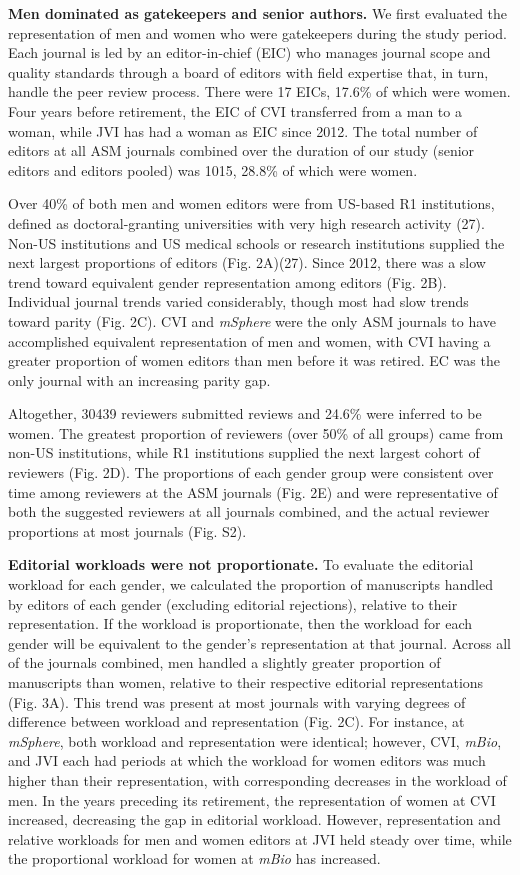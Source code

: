 \documentclass[11pt,]{article}
\begin{document}
\textbf{Men dominated as gatekeepers and senior authors.} We first
evaluated the representation of men and women who were gatekeepers
during the study period. Each journal is led by an editor-in-chief (EIC)
who manages journal scope and quality standards through a board of
editors with field expertise that, in turn, handle the peer review
process. There were 17 EICs, 17.6\% of which were women. Four years
before retirement, the EIC of CVI transferred from a man to a woman,
while JVI has had a woman as EIC since 2012. The total number of editors
at all ASM journals combined over the duration of our study (senior
editors and editors pooled) was 1015, 28.8\% of which were women.

Over 40\% of both men and women editors were from US-based R1
institutions, defined as doctoral-granting universities with very high
research activity (27). Non-US institutions and US medical schools or
research institutions supplied the next largest proportions of editors
(Fig. 2A)(27). Since 2012, there was a slow trend toward equivalent
gender representation among editors (Fig. 2B). Individual journal trends
varied considerably, though most had slow trends toward parity (Fig.
2C). CVI and \emph{mSphere} were the only ASM journals to have
accomplished equivalent representation of men and women, with CVI having
a greater proportion of women editors than men before it was retired. EC
was the only journal with an increasing parity gap.

Altogether, 30439 reviewers submitted reviews and 24.6\% were inferred
to be women. The greatest proportion of reviewers (over 50\% of all
groups) came from non-US institutions, while R1 institutions supplied
the next largest cohort of reviewers (Fig. 2D). The proportions of each
gender group were consistent over time among reviewers at the ASM
journals (Fig. 2E) and were representative of both the suggested
reviewers at all journals combined, and the actual reviewer proportions
at most journals (Fig. S2).

\textbf{Editorial workloads were not proportionate.} To evaluate the
editorial workload for each gender, we calculated the proportion of
manuscripts handled by editors of each gender (excluding editorial
rejections), relative to their representation. If the workload is
proportionate, then the workload for each gender will be equivalent to
the gender's representation at that journal. Across all of the journals
combined, men handled a slightly greater proportion of manuscripts than
women, relative to their respective editorial representations (Fig. 3A).
This trend was present at most journals with varying degrees of
difference between workload and representation (Fig. 2C). For instance,
at \emph{mSphere}, both workload and representation were identical;
however, CVI, \emph{mBio}, and JVI each had periods at which the
workload for women editors was much higher than their representation,
with corresponding decreases in the workload of men. In the years
preceding its retirement, the representation of women at CVI increased,
decreasing the gap in editorial workload. However, representation and
relative workloads for men and women editors at JVI held steady over
time, while the proportional workload for women at \emph{mBio} has
increased.
\end{document}
